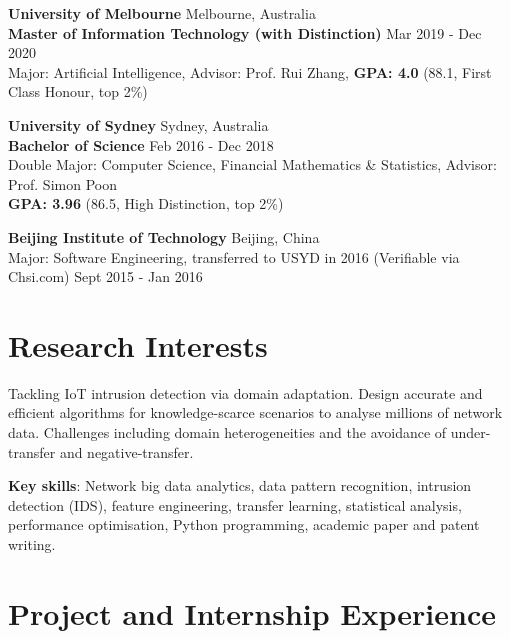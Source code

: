 \documentclass[letterpaper,10.9pt]{article}
\begin{document}
\textbf{University of Melbourne} \hfill Melbourne, Australia\\
\textbf{Master of Information Technology (with Distinction)} \hfill Mar 2019 - Dec 2020\\
Major: Artificial Intelligence, Advisor: Prof. Rui Zhang, \textbf{GPA: 4.0} (88.1, First Class Honour, top 2\%)

\vspace{10pt}

\textbf{University of Sydney} \hfill Sydney, Australia\\
\textbf{Bachelor of Science} \hfill Feb 2016 - Dec 2018\\
Double Major: Computer Science, Financial Mathematics \& Statistics, Advisor: Prof. Simon Poon\\
\textbf{GPA: 3.96} (86.5, High Distinction, top 2\%)

\vspace{10pt}

\textbf{Beijing Institute of Technology} \hfill Beijing, China\\
Major: Software Engineering, transferred to USYD in 2016 (Verifiable via Chsi.com) \hfill Sept 2015 - Jan 2016\\




\section{\textbf{Research Interests}}

Tackling IoT intrusion detection via domain adaptation. Design accurate and efficient algorithms for knowledge-scarce scenarios to analyse millions of network data. Challenges including domain heterogeneities and the avoidance of under-transfer and negative-transfer. 

\vspace{2mm}

\textbf{Key skills}: Network big data analytics, data pattern recognition, intrusion detection (IDS), feature engineering, transfer learning, statistical analysis, performance optimisation, Python programming, academic paper and patent writing. 




\section{\textbf{Project and Internship Experience}}
\end{document}
